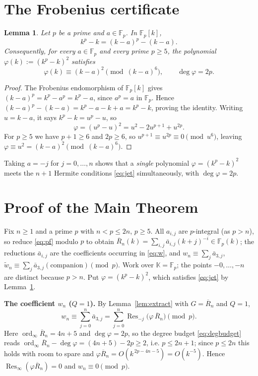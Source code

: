 \documentclass[11pt]{article}
\newtheorem{lemma}[theorem]{Lemma}
\theoremstyle{definition}
\DeclareMathOperator{\ord}{ord}
\DeclareMathOperator{\Res}{Res}
\newcommand{\Fp}{\mathbb{F}_p}
\newcommand{\wt}{\widetilde}
\begin{document}
\section{The Frobenius certificate}\label{sec:cert}

\begin{lemma}\label{lem:frob}
Let $p$ be a prime and $a\in\Fp$. In $\Fp[k]$,
\[
k^p-k=(k-a)^p-(k-a).
\]
Consequently, for every $a\in\Fp$ and every prime $p\ge5$, the polynomial
$\varphi(k):=(k^p-k)^2$ satisfies
\[
\varphi(k)\equiv (k-a)^2 \pmod{(k-a)^6},\qquad \deg\varphi=2p .
\]
\end{lemma}

\begin{proof}
The Frobenius endomorphism of $\Fp[k]$ gives $(k-a)^p=k^p-a^p=k^p-a$, since
$a^p=a$ in $\Fp$. Hence $(k-a)^p-(k-a)=k^p-a-k+a=k^p-k$, proving the identity.
Writing $u=k-a$, it says $k^p-k=u^p-u$, so
\[
\varphi=(u^p-u)^2=u^2-2u^{p+1}+u^{2p}.
\]
For $p\ge5$ we have $p+1\ge6$ and $2p\ge6$, so $u^{p+1}\equiv u^{2p}\equiv0
\pmod{u^6}$, leaving $\varphi\equiv u^2=(k-a)^2\pmod{(k-a)^6}$.
\end{proof}

Taking $a=-j$ for $j=0,\dots,n$ shows that a \emph{single} polynomial
$\varphi=(k^p-k)^2$ meets the $n+1$ Hermite conditions \eqref{eq:jet}
simultaneously, with $\deg\varphi=2p$.

\section{Proof of the Main Theorem}\label{sec:proof}

Fix $n\ge1$ and a prime $p$ with $n<p\le2n$, $p\ge5$. All $a_{i,j}$ are
$p$-integral (as $p>n$), so reduce \eqref{eq:pf} modulo $p$ to obtain
$\overline R_n(k)=\sum_{i,j}\bar a_{i,j}(k+j)^{-i}\in\Fp(k)$; the reductions
$\bar a_{i,j}$ are the coefficients occurring in \eqref{eq:w}, and
$w_n\equiv\sum_j\bar a_{3,j}$, $\wt w_n\equiv\sum_j\bar a_{3,j}(\text{companion})
\pmod p$. Work over $\mathbb K=\Fp$; the points $-0,\dots,-n$ are distinct because
$p>n$. Put $\varphi=(k^p-k)^2$, which satisfies \eqref{eq:jet} by
Lemma~\ref{lem:frob}.

\medskip
\noindent\textbf{The coefficient $w_n$ ($Q=1$).}
By Lemma~\ref{lem:extract} with $G=\overline R_n$ and $Q=1$,
\[
w_n\equiv\sum_{j=0}^n\bar a_{3,j}
=\sum_{j=0}^{n}\Res_{-j}\bigl(\varphi\,\overline R_n\bigr)\pmod p .
\]
Here $\ord_\infty\overline R_n=4n+5$ and $\deg\varphi=2p$, so the degree budget
\eqref{eq:degbudget} reads $\ord_\infty\overline R_n-\deg\varphi=(4n+5)-2p\ge2$,
i.e. $p\le2n+1$; since $p\le2n$ this holds with room to spare and
$\varphi\overline R_n=O(k^{\,2p-4n-5})=O(k^{-5})$. Hence
$\Res_\infty(\varphi\overline R_n)=0$ and $w_n\equiv0\pmod p$.
\end{document}
